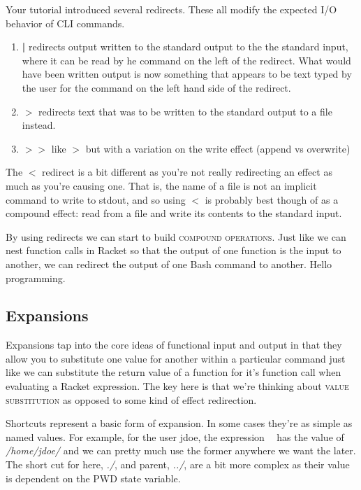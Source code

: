 \documentclass[nobib]{tufte-handout}
\begin{document}
Your tutorial introduced several redirects. These all modify the expected I/O behavior of CLI commands.
\begin{enumerate}
\item \textbf{|} redirects output written to the standard output to the the standard input, where it can be read by he command on the left of the redirect. What would have been written output is now something that appears to be text typed by the user for the command on the left hand side of the redirect.
\newline
\item \textbf{$>$} redirects text that was to be written to the standard output to a file instead.
\item \textbf{$>>$} like \textit{$>$} but with a variation on the write effect (append vs overwrite)
\end{enumerate}
The \textbf{$<$} redirect is a bit different as you're not really redirecting an effect as much as you're causing one.  That is, the name of a file is not an implicit command to write to stdout, and so using $<$ is probably best though of as a compound effect: read from a file and write its contents to the standard input.

By using redirects we can start to build \textsc{compound operations}. Just like we can nest function calls in Racket so that the output of one function is the input to another, we can redirect the output of one Bash command to another. Hello programming.

\subsection{Expansions}

Expansions tap into the core ideas of functional input and output in that they allow you to substitute one value for another within a particular command just like we can substitute the return value of a function for it's function call when evaluating a Racket expression.  The key here is that we're thinking about \textsc{value substitution} as opposed to some kind of effect redirection.

Shortcuts represent a basic form of expansion.  In some cases they're as simple as named values. For example, for the user jdoe, the expression \textbf{~} has the value of \textit{/home/jdoe/} and we can pretty much use the former anywhere we want the later. The short cut for here, \textit{./}, and parent, \textit{../}, are a bit more complex as their value is dependent on the PWD state variable.
\end{document}
